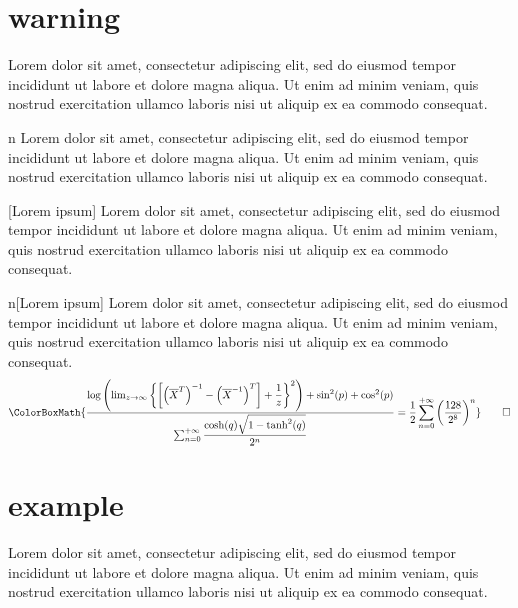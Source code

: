 \newpage

\section{warning}

\begin{warning}{}
	Lorem dolor sit amet, consectetur adipiscing elit, sed do eiusmod tempor incididunt ut labore et dolore magna aliqua. Ut enim ad minim veniam, quis nostrud exercitation ullamco laboris nisi ut aliquip ex ea commodo consequat.
\end{warning}

\begin{warning}{n}
	Lorem dolor sit amet, consectetur adipiscing elit, sed do eiusmod tempor incididunt ut labore et dolore magna aliqua. Ut enim ad minim veniam, quis nostrud exercitation ullamco laboris nisi ut aliquip ex ea commodo consequat.
\end{warning}

\begin{warning}{}[Lorem ipsum]
	Lorem dolor sit amet, consectetur adipiscing elit, sed do eiusmod tempor incididunt ut labore et dolore magna aliqua. Ut enim ad minim veniam, quis nostrud exercitation ullamco laboris nisi ut aliquip ex ea commodo consequat.
\end{warning}

\begin{warning}{n}[Lorem ipsum]
	Lorem dolor sit amet, consectetur adipiscing elit, sed do eiusmod tempor incididunt ut labore et dolore magna aliqua. Ut enim ad minim veniam, quis nostrud exercitation ullamco laboris nisi ut aliquip ex ea commodo consequat.
	\begin{equation*}
		\ColorBoxMath{\dfrac{\log\left(\lim_{z\to\infty}\left\{\left[\left(\overline{X}^{T}\right)^{-1}-\left(\overline{X}^{-1}\right)^T\right]+\dfrac{1}{z}\right\}^2\right)+\sin^2(p)+\cos^2(p)}{\sum_{n=0}^{+\infty}\dfrac{\cosh(q)\sqrt{1-\tanh^2(q)}}{2^n}}=\dfrac{1}{2}\sum_{n=0}^{+\infty}\left(\dfrac{128}{2^8}\right)^n}\qedhere
	\end{equation*}
\end{warning}

\newpage

\section{example}

\begin{example}{}
	Lorem dolor sit amet, consectetur adipiscing elit, sed do eiusmod tempor incididunt ut labore et dolore magna aliqua. Ut enim ad minim veniam, quis nostrud exercitation ullamco laboris nisi ut aliquip ex ea commodo consequat.
\end{example}

